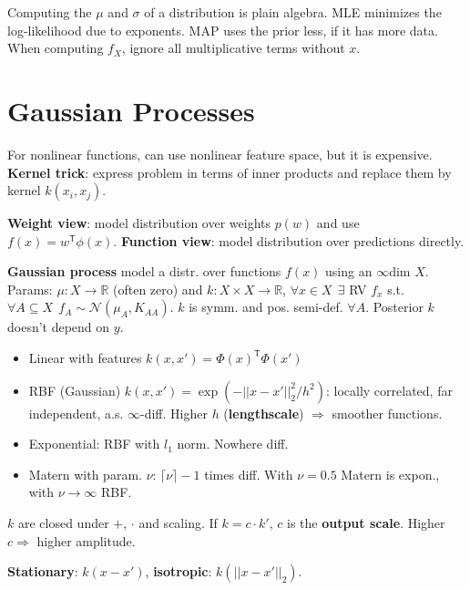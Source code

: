 \documentclass[11pt,landscape,a4paper,fleqn]{article}
\newcommand*{\tran}{^{\mathsf{T}}} %
\begin{document}
\begin{multicols*}{4}
Computing the \(\mu\) and \(\sigma\) of a distribution is plain algebra.
MLE minimizes the log-likelihood due to exponents.
MAP uses the prior less, if it has more data. \qquad\qquad
When computing \(f_X\), ignore all multiplicative terms without \(x\).

\section{Gaussian Processes}

For nonlinear functions, can use nonlinear feature space, but it is expensive.
\textbf{Kernel trick}: express problem in terms of inner products and replace them by kernel \(k(x_i, x_j)\).

\textbf{Weight view}: model distribution over weights \(p(w)\) and use \(f(x) = w\tran \phi(x)\).
\textbf{Function view}: model distribution over predictions directly.


\textbf{Gaussian process} model a distr. over functions \(f(x)\) using an \(\infty\)dim \(X\).
Params: \(\mu : X \to \mathbb{R}\) (often zero) and \(k : X \times X \to \mathbb{R}\),
\(\forall x \in X \ \ \exists \) RV \(f_x\) s.t.
\(\forall A \subseteq X \ \ f_A \sim \mathcal{N}(\mu_A, K_{AA})\).
\(k\) is symm. and pos. semi-def. \(\forall A\).
Posterior \(k\) doesn't depend on \(y\).

\begin{itemize}
    \item Linear with features \(k(x, x') = \Phi(x)\tran \Phi(x')\)
    \item RBF (Gaussian) \(k(x, x') = \exp( - ||x - x'||_2^2 / h^2 )\): locally correlated, far independent, a.s. \( \infty\)-diff.
    Higher \(h\) (\textbf{lengthscale}) \( \Rightarrow \) smoother functions.
    \item Exponential: RBF with \(l_1\) norm. Nowhere diff.
    \item Matern with param. \(\nu\): \(\lceil \nu \rceil - 1\) times diff.
    With \(\nu = 0.5\) Matern is expon., with \(\nu \to \infty\) RBF.
\end{itemize}

\(k\) are closed under \(+\), \(\cdot\) and scaling.
If \(k = c \cdot k'\), \(c\) is the \textbf{output scale}.
Higher \(c \Rightarrow \) higher amplitude.

\textbf{Stationary}: \(k(x - x')\), \textbf{isotropic}: \(k(||x - x'||_2)\).


\end{multicols*}
\end{document}
